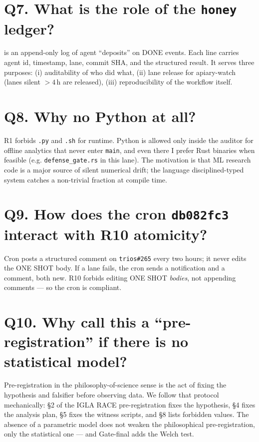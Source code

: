 \section*{Q7. What is the role of the \texttt{honey} ledger?}
 is an append-only log of agent ``deposits''
on DONE events. Each line carries agent id, timestamp, lane, commit SHA, and
the structured result. It serves three purposes: (i) auditability of who did
what, (ii) lane release for apiary-watch (lanes silent $>\!4$\,h are released),
(iii) reproducibility of the workflow itself.

\section*{Q8. Why no Python at all?}
R1 forbids \texttt{.py} and \texttt{.sh} for runtime. Python is allowed only
inside the auditor for offline analytics that never enter \texttt{main}, and
even there I prefer Rust binaries when feasible (e.g. \texttt{defense\_gate.rs}
in this lane). The motivation is that ML research code is a major source of
silent numerical drift; the language disciplined-typed system catches a
non-trivial fraction at compile time.

\section*{Q9. How does the cron \texttt{db082fc3} interact with R10 atomicity?}
Cron posts a structured comment on \texttt{trios\#265} every two hours; it
never edits the ONE SHOT body. If a lane fails, the cron sends a notification
and a comment, both new. R10 forbids editing ONE SHOT \emph{bodies}, not
appending comments — so the cron is compliant.

\section*{Q10. Why call this a ``pre-registration'' if there is no statistical model?}
Pre-registration in the philosophy-of-science sense
\cite{nosek_preregistration} is the act of fixing the hypothesis and
falsifier before observing data. We follow that protocol mechanically: §2 of
the IGLA RACE pre-registration fixes the hypothesis, §4 fixes the analysis
plan, §5 fixes the witness scripts, and §8 lists forbidden values. The
absence of a parametric model does not weaken the philosophical
pre-registration, only the statistical one — and Gate-final adds the Welch
test.

